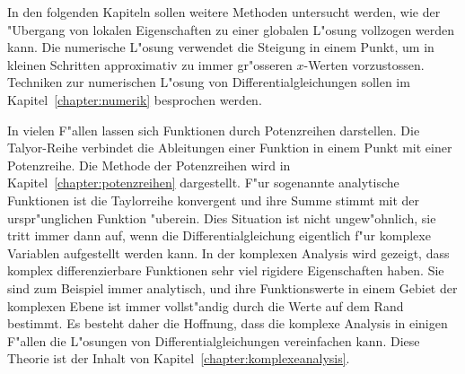 In den folgenden Kapiteln sollen weitere Methoden untersucht werden,
wie der "Ubergang von lokalen Eigenschaften zu einer globalen L"osung
vollzogen werden kann.
Die numerische L"osung verwendet die Steigung in einem Punkt, um in kleinen
Schritten approximativ zu immer gr"osseren $x$-Werten vorzustossen.
Techniken zur numerischen L"osung von Differentialgleichungen sollen
im Kapitel~\ref{chapter:numerik} besprochen werden.

In vielen F"allen lassen sich Funktionen durch Potenzreihen darstellen.
Die Talyor-Reihe verbindet die Ableitungen einer Funktion in einem Punkt
mit einer Potenzreihe. 
Die Methode der Potenzreihen wird in Kapitel~\ref{chapter:potenzreihen}
dargestellt.
F"ur sogenannte analytische Funktionen ist die Taylorreihe konvergent
und ihre Summe stimmt mit der urspr"unglichen Funktion "uberein.
Dies Situation ist nicht ungew"ohnlich, sie tritt immer dann auf, wenn
die Differentialgleichung eigentlich f"ur komplexe Variablen aufgestellt
werden kann.
In der komplexen Analysis wird gezeigt, dass komplex differenzierbare
Funktionen sehr viel rigidere Eigenschaften haben.
Sie sind zum Beispiel immer analytisch, und ihre Funktionswerte in
einem Gebiet der komplexen Ebene ist immer vollst"andig durch die Werte
auf dem Rand bestimmt.
Es besteht daher die Hoffnung, dass die komplexe Analysis in einigen
F"allen die L"osungen von Differentialgleichungen vereinfachen kann.
Diese Theorie ist der Inhalt von Kapitel~\ref{chapter:komplexeanalysis}.
